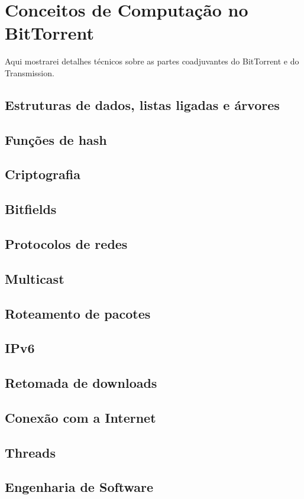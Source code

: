 
\chapter{Conceitos de Computação no BitTorrent}

Aqui mostrarei detalhes técnicos sobre as partes coadjuvantes do BitTorrent e do Transmission.


\section{Estruturas de dados, listas ligadas e árvores}
\section{Funções de hash} %
\label{sec:sha1}
\section{Criptografia} %
\section{Bitfields}
\section{Protocolos de redes} %
\section{Multicast}
\section{Roteamento de pacotes} %
\section{IPv6}
\section{Retomada de downloads}
\section{Conexão com a Internet}
\section{Threads}
\section{Engenharia de Software}

\afterpage{\clearpage}
